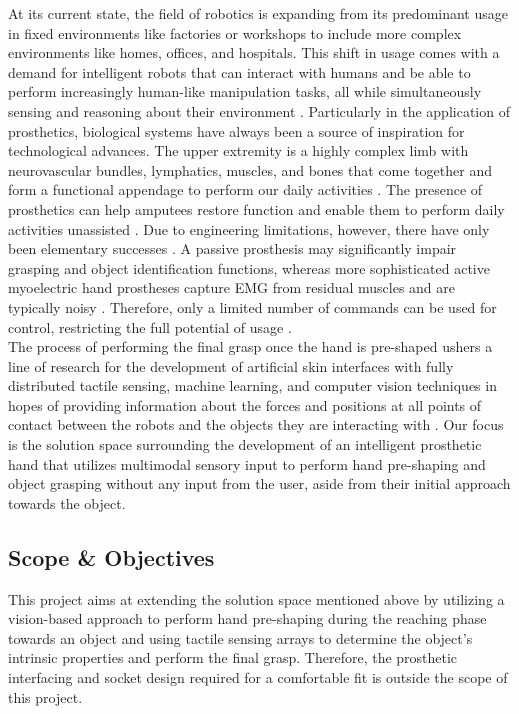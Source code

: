 \documentclass[11.5pt]{article}
\begin{document}
At its current state, the field of robotics is expanding from its predominant usage in fixed environments like factories or workshops to include more complex environments like homes, offices, and hospitals. This shift in usage comes with a demand for intelligent robots that can interact with humans and be able to perform increasingly human-like manipulation tasks, all while simultaneously sensing and reasoning about their environment \cite{Yousef2011-rc}. Particularly in the application of prosthetics, biological systems have always been a source of inspiration for technological advances. The upper extremity is a highly complex limb with neurovascular bundles, lymphatics, muscles, and bones that come together and form a functional appendage to perform our daily activities \cite{Maduri2019-ry}. The presence of prosthetics can help amputees restore function and enable them to perform daily activities unassisted \cite{Su2019-ws}. Due to engineering limitations, however, there have only been elementary successes \cite{Dehghani2010-yz}. A passive prosthesis may significantly impair grasping and object identification functions, whereas more sophisticated active myoelectric hand prostheses capture EMG from residual muscles and are typically noisy \cite{Su2019-ws, Taverne2019-ve}. Therefore, only a limited number of commands can be used for control, restricting the full potential of usage \cite{Taverne2019-ve}.\\ 

The process of performing the final grasp once the hand is pre-shaped ushers a line of research for the development of artificial skin interfaces with fully distributed tactile sensing, machine learning, and computer vision techniques in hopes of providing information about the forces and positions at all points of contact between the robots and the objects they are interacting with \cite{Yousef2011-rc, Schiefer2018-tt}. Our focus is the solution space surrounding the development of an intelligent prosthetic hand that utilizes multimodal sensory input to perform hand pre-shaping and object grasping without any input from the user, aside from their initial approach towards the object.

\subsection{Scope \& Objectives}

This project aims at extending the solution space mentioned above by utilizing a vision-based approach to perform hand pre-shaping during the reaching phase towards an object and using tactile sensing arrays to determine the object's intrinsic properties and perform the final grasp. Therefore, the prosthetic interfacing and socket design required for a comfortable fit is outside the scope of this project.\\
\end{document}
